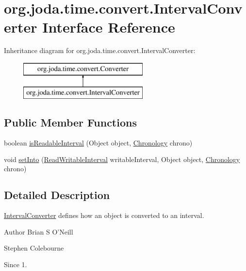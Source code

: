 \hypertarget{interfaceorg_1_1joda_1_1time_1_1convert_1_1_interval_converter}{\section{org.\-joda.\-time.\-convert.\-Interval\-Converter Interface Reference}
\label{interfaceorg_1_1joda_1_1time_1_1convert_1_1_interval_converter}
}
Inheritance diagram for org.\-joda.\-time.\-convert.\-Interval\-Converter\-:\begin{figure}[H]
\begin{center}
\leavevmode
\includegraphics[height=2.000000cm]{interfaceorg_1_1joda_1_1time_1_1convert_1_1_interval_converter}
\end{center}
\end{figure}
\subsection*{Public Member Functions}
\begin{DoxyCompactItemize}
\item 
boolean \hyperlink{interfaceorg_1_1joda_1_1time_1_1convert_1_1_interval_converter_a8371390bc17d5a8c711b8341c9019ad0}{is\-Readable\-Interval} (Object object, \hyperlink{classorg_1_1joda_1_1time_1_1_chronology}{Chronology} chrono)
\item 
void \hyperlink{interfaceorg_1_1joda_1_1time_1_1convert_1_1_interval_converter_a6c7ad7f9d67a354e387dcb7d2662c3b1}{set\-Into} (\hyperlink{interfaceorg_1_1joda_1_1time_1_1_read_writable_interval}{Read\-Writable\-Interval} writable\-Interval, Object object, \hyperlink{classorg_1_1joda_1_1time_1_1_chronology}{Chronology} chrono)
\end{DoxyCompactItemize}


\subsection{Detailed Description}
\hyperlink{interfaceorg_1_1joda_1_1time_1_1convert_1_1_interval_converter}{Interval\-Converter} defines how an object is converted to an interval.

\begin{DoxyAuthor}{Author}
Brian S O'Neill 

Stephen Colebourne 
\end{DoxyAuthor}
\begin{DoxySince}{Since}
1. 
\end{DoxySince}


